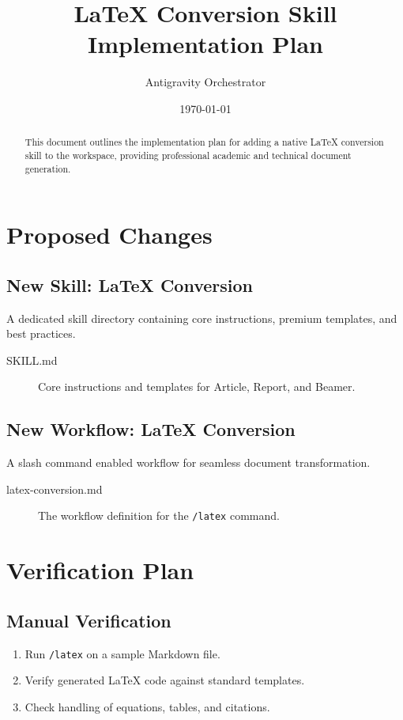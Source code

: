 \documentclass[11pt,a4paper]{article}
\title{LaTeX Conversion Skill Implementation Plan}
\author{Antigravity Orchestrator}
\date{\today}
\begin{document}
\maketitle

\begin{abstract}
This document outlines the implementation plan for adding a native LaTeX conversion skill to the workspace, providing professional academic and technical document generation.
\end{abstract}

\section{Proposed Changes}

\subsection{New Skill: LaTeX Conversion}
A dedicated skill directory containing core instructions, premium templates, and best practices.
\begin{description}
    \item[SKILL.md] Core instructions and templates for Article, Report, and Beamer.
\end{description}

\subsection{New Workflow: LaTeX Conversion}
A slash command enabled workflow for seamless document transformation.
\begin{description}
    \item[latex-conversion.md] The workflow definition for the \texttt{/latex} command.
\end{description}

\section{Verification Plan}

\subsection{Manual Verification}
\begin{enumerate}
    \item Run \texttt{/latex} on a sample Markdown file.
    \item Verify generated LaTeX code against standard templates.
    \item Check handling of equations, tables, and citations.
\end{enumerate}
\end{document}
